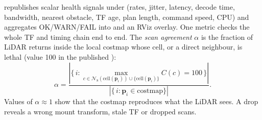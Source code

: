  republishes scalar health signals under 
(rates, jitter, latency, decode time, bandwidth, nearest obstacle, TF age, plan length,
command speed, CPU) and aggregates OK/WARN/FAIL into  and an RViz
overlay. One metric checks the whole TF and timing chain end to end. The
\emph{scan agreement} $\alpha$ is the fraction of LiDAR returns inside the local
costmap whose cell, or a direct neighbour, is lethal (value 100 in the published
):
\begin{equation}
  \alpha = \frac{\left|\{\,i : \max_{c\in\mathcal{N}_8(\text{cell}(\mathbf{p}_i))\cup\{\text{cell}(\mathbf{p}_i)\}} C(c) = 100\,\}\right|}{\left|\{\,i : \mathbf{p}_i \in \text{costmap}\}\right|}.
  \label{eq:agreement}
\end{equation}
Values of $\alpha\approx1$ show that the costmap reproduces what the LiDAR sees. A
drop reveals a wrong mount transform, stale TF or dropped scans.
